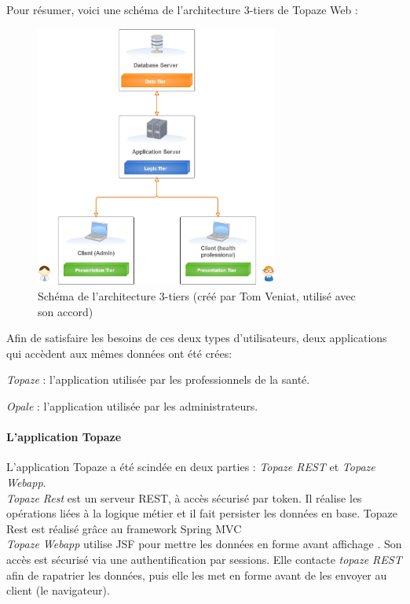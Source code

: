 Pour résumer, voici une schéma de l'architecture 3-tiers de Topaze Web :
\begin{figure}[H]
  \centering
  \includegraphics[width=8cm]{./img/architecture1}
  \caption{\label{fig:mb_va_ast} Schéma de l'architecture 3-tiers (créé par Tom Veniat, utilisé avec son accord)}
\end{figure}

Afin de satisfaire les besoins de ces deux types d'utilisateurs, deux applications qui accèdent aux mêmes données ont été crées: 

\begin{sitemize}
\item \textit{Topaze} : l'application utilisée par les professionnels de la santé. 
\item \textit{Opale} : l'application utilisée par les administrateurs.
\end{sitemize}

\paragraph*{L'application Topaze\\}
L'application Topaze a été scindée en deux parties : \textit{Topaze REST} et \textit{Topaze Webapp}.\\
\textit{Topaze Rest} est un serveur REST, à accès sécurisé par token. Il réalise les opérations liées à la logique métier et il fait persister les données en base. Topaze Rest est réalisé grâce au framework Spring MVC \cite{bib:spring}\\
\textit{Topaze Webapp} utilise JSF pour mettre les données en forme avant affichage \cite{bib:jsf}. Son accès est sécurisé via une authentification par sessions. Elle contacte \textit{topaze REST} afin de rapatrier les données, puis elle les met en forme avant de les envoyer au client (le navigateur).


